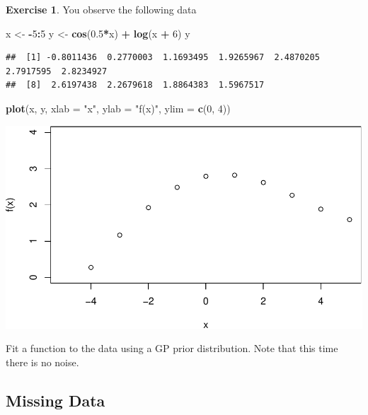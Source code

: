 \documentclass[
]{book}
\newenvironment{Shaded}{\begin{snugshade}}{\end{snugshade}}
\newcommand{\AttributeTok}[1]{\textcolor[rgb]{0.13,0.29,0.53}{#1}}
\newcommand{\DecValTok}[1]{\textcolor[rgb]{0.00,0.00,0.81}{#1}}
\newcommand{\FloatTok}[1]{\textcolor[rgb]{0.00,0.00,0.81}{#1}}
\newcommand{\FunctionTok}[1]{\textcolor[rgb]{0.13,0.29,0.53}{\textbf{#1}}}
\newcommand{\NormalTok}[1]{#1}
\newcommand{\OtherTok}[1]{\textcolor[rgb]{0.56,0.35,0.01}{#1}}
\newcommand{\SpecialCharTok}[1]{\textcolor[rgb]{0.81,0.36,0.00}{\textbf{#1}}}
\newcommand{\StringTok}[1]{\textcolor[rgb]{0.31,0.60,0.02}{#1}}
\theoremstyle{definition}
\theoremstyle{definition}
\theoremstyle{definition}
\newtheorem{exercise}{Exercise}[chapter]
\theoremstyle{definition}
\theoremstyle{remark}
\begin{document}
\begin{exercise}
You observe the following data

\begin{Shaded}
\begin{Highlighting}[]
\NormalTok{x }\OtherTok{\textless{}{-}} \SpecialCharTok{{-}}\DecValTok{5}\SpecialCharTok{:}\DecValTok{5}
\NormalTok{y }\OtherTok{\textless{}{-}} \FunctionTok{cos}\NormalTok{(}\FloatTok{0.5}\SpecialCharTok{*}\NormalTok{x) }\SpecialCharTok{+} \FunctionTok{log}\NormalTok{(x }\SpecialCharTok{+} \DecValTok{6}\NormalTok{)}
\NormalTok{y}
\end{Highlighting}
\end{Shaded}

\begin{verbatim}
##  [1] -0.8011436  0.2770003  1.1693495  1.9265967  2.4870205  2.7917595  2.8234927
##  [8]  2.6197438  2.2679618  1.8864383  1.5967517
\end{verbatim}

\begin{Shaded}
\begin{Highlighting}[]
\FunctionTok{plot}\NormalTok{(x, y, }\AttributeTok{xlab =} \StringTok{"x"}\NormalTok{, }\AttributeTok{ylab =} \StringTok{"f(x)"}\NormalTok{, }\AttributeTok{ylim =} \FunctionTok{c}\NormalTok{(}\DecValTok{0}\NormalTok{, }\DecValTok{4}\NormalTok{))}
\end{Highlighting}
\end{Shaded}

\includegraphics{_main_files/figure-latex/unnamed-chunk-58-1.pdf}

Fit a function to the data using a GP prior distribution. Note that this time there is no noise.
\end{exercise}

\hypertarget{missing-data}{%
\subsection{Missing Data}\label{missing-data}}
\end{document}
